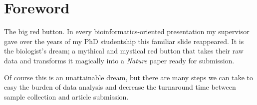 \chapter*{Foreword}
\setlength\parindent{0pt}
\vspace{-1cm}
The big red button. In every bioinformatics-oriented presentation my supervisor gave over the years of my PhD studentship this familiar slide reappeared.
It is the biologist's dream; a mythical and mystical red button that takes their raw data and transforms it magically into a \emph{Nature} paper ready for submission.


Of course this is an unattainable dream, but there are many steps we can take to easy the burden of data analysis and decrease the
turnaround time between sample collection and article submission. 
